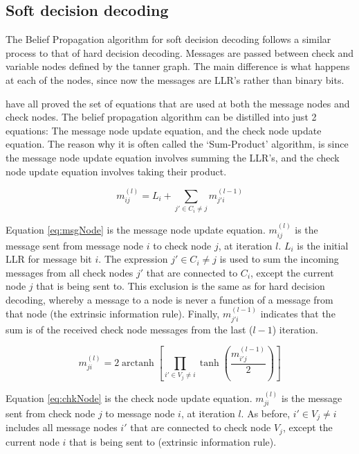 \documentclass[11pt]{article}
\numberwithin{equation}{subsection}
\DeclareMathOperator\arctanh{arctanh}
\begin{document}
\subsection{Soft decision decoding}
The Belief Propagation algorithm for soft decision decoding follows a similar process to that of hard decision decoding. Messages are passed between check and variable nodes defined by the tanner graph. The main difference is what happens at each of the nodes, since now the messages are LLR's rather than binary bits. 

\cite{ldpc-tutorial1,mncisit,gallager1962low} have all proved the set of equations that are used at both the message nodes and check nodes. The belief propagation algorithm can be distilled into just 2 equations: The message node update equation, and the check node update equation. The reason why it is often called the `Sum-Product' algorithm, is since the message node update equation involves summing the LLR's, and the check node update equation involves taking their product.

\begin{equation} \label{eq:msgNode}
m_{ij}^{(l)} = L_i+\sum\limits_{j'\in C_i \ne j}m_{j'i}^{(l-1)}
\end{equation}

Equation \ref{eq:msgNode} is the message node update equation. $m_{ij}^{(l)}$ is the message sent from message node $i$ to check node $j$, at iteration $l$. $L_i$ is the initial LLR for message bit $i$. The expression $j'\in C_i \ne j$ is used to sum the incoming messages from all check nodes $j'$ that are connected to $C_i$, except the current node $j$ that is being sent to. This exclusion is the same as for hard decision decoding, whereby a message to a node is never a function of a message from that node (the extrinsic information rule). Finally, $m_{j'i}^{(l-1)}$ indicates that the sum is of the received check node messages from the last ($l-1$) iteration.

\begin{equation} \label{eq:chkNode}
m_{ji}^{(l)} = 2\arctanh\left[\prod\limits_{i'\in V_j\ne i} \tanh(\dfrac{m_{i'j}^{(l-1)}}{2})\right]
\end{equation}

Equation \ref{eq:chkNode} is the check node update equation. $m_{ji}^{(l)}$ is the message sent from check node $j$ to message node $i$, at iteration $l$. As before, $i'\in V_j\ne i$ includes all message nodes $i'$ that are connected to check node $V_j$, except the current node $i$ that is being sent to (extrinsic information rule).
\end{document}
